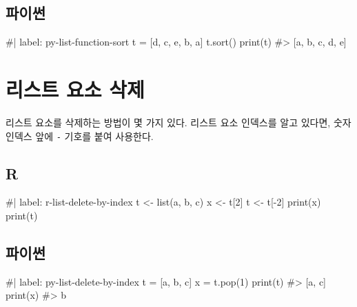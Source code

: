 \documentclass[
  letterpaper,
]{book}
\newenvironment{Shaded}{\begin{snugshade}}{\end{snugshade}}
\newcommand{\NormalTok}[1]{\textcolor[rgb]{0.00,0.23,0.31}{#1}}
\begin{document}
\subsection{파이썬}

\begin{Shaded}
\begin{Highlighting}[]
\NormalTok{\#| label: py{-}list{-}function{-}sort}
\NormalTok{t = [\textquotesingle{}d\textquotesingle{}, \textquotesingle{}c\textquotesingle{}, \textquotesingle{}e\textquotesingle{}, \textquotesingle{}b\textquotesingle{}, \textquotesingle{}a\textquotesingle{}]}
\NormalTok{t.sort()}
\NormalTok{print(t)}
\NormalTok{\#\textgreater{} [\textquotesingle{}a\textquotesingle{}, \textquotesingle{}b\textquotesingle{}, \textquotesingle{}c\textquotesingle{}, \textquotesingle{}d\textquotesingle{}, \textquotesingle{}e\textquotesingle{}]}
\end{Highlighting}
\end{Shaded}

\section{리스트 요소 삭제}\label{r-list-delete}

 

리스트 요소를 삭제하는 방법이 몇 가지 있다. 리스트 요소 인덱스를 알고
있다면, 숫자 인덱스 앞에 \texttt{-} 기호를 붙여 사용한다.

\subsection{R}

\begin{Shaded}
\begin{Highlighting}[]
\NormalTok{\#| label: r{-}list{-}delete{-}by{-}index}
\NormalTok{t \textless{}{-} list(\textquotesingle{}a\textquotesingle{}, \textquotesingle{}b\textquotesingle{}, \textquotesingle{}c\textquotesingle{})}
\NormalTok{x \textless{}{-} t[2]}
\NormalTok{t \textless{}{-} t[{-}2]}
\NormalTok{print(x)}
\NormalTok{print(t)}
\end{Highlighting}
\end{Shaded}

\subsection{파이썬}

\begin{Shaded}
\begin{Highlighting}[]
\NormalTok{\#| label: py{-}list{-}delete{-}by{-}index}
\NormalTok{t = [\textquotesingle{}a\textquotesingle{}, \textquotesingle{}b\textquotesingle{}, \textquotesingle{}c\textquotesingle{}]}
\NormalTok{x = t.pop(1)}
\NormalTok{print(t)}
\NormalTok{\#\textgreater{} [\textquotesingle{}a\textquotesingle{}, \textquotesingle{}c\textquotesingle{}]}
\NormalTok{print(x)}
\NormalTok{\#\textgreater{} b}
\end{Highlighting}
\end{Shaded}
\end{document}
